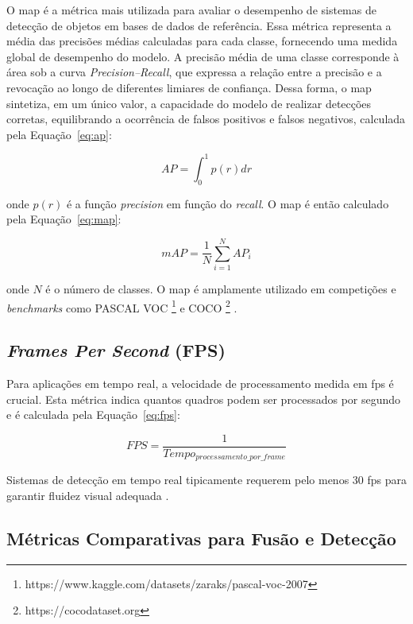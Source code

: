 O \gls{map} é a métrica mais utilizada para avaliar o desempenho de sistemas de detecção de objetos em bases de dados de referência. Essa métrica representa a média das precisões médias calculadas para cada classe, fornecendo uma medida global de desempenho do modelo.
A precisão média de uma classe corresponde à área sob a curva \textit{Precision–Recall}, que expressa a relação entre a precisão e a revocação ao longo de diferentes limiares de confiança.
Dessa forma, o \gls{map} sintetiza, em um único valor, a capacidade do modelo de realizar detecções corretas, equilibrando a ocorrência de falsos positivos e falsos negativos, calculada pela Equação~\ref{eq:ap}:

\begin{equation}
\label{eq:ap}
AP = \int_{0}^{1} p(r)dr
\end{equation}

\noindent onde $p(r)$ é a função \textit{precision} em função do \textit{recall}. O \gls{map} é então calculado pela Equação~\ref{eq:map}:

\begin{equation}
\label{eq:map}
mAP = \frac{1}{N} \sum_{i=1}^{N} AP_i
\end{equation}

\noindent onde $N$ é o número de classes. O \gls{map} é amplamente utilizado em competições e \textit{benchmarks} como PASCAL VOC \footnote{https://www.kaggle.com/datasets/zaraks/pascal-voc-2007} e COCO \footnote{https://cocodataset.org} \cite{lin2014microsoft}.

\subsection*{\textit{Frames Per Second} (FPS)}

Para aplicações em tempo real, a velocidade de processamento medida em \gls{fps} é crucial. Esta métrica indica quantos quadros podem ser processados por segundo e é calculada pela Equação~\ref{eq:fps}:

\begin{equation}
\label{eq:fps}
FPS = \frac{1}{Tempo_{processamento\_por\_frame}}
\end{equation}

Sistemas de detecção em tempo real tipicamente requerem pelo menos 30 \gls{fps} para garantir fluidez visual adequada \cite{redmon2016you}.

\subsection{Métricas Comparativas para Fusão e Detecção}

